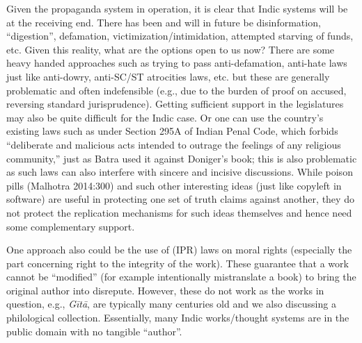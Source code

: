 Given the propaganda system in operation, it is clear that Indic systems will be at the receiving end. There has been and will in future be disinformation, “digestion”, defamation, victimization/intimidation, attempted starving of funds, etc. Given this reality, what are the options open to us now? There are some heavy handed approaches such as trying to pass anti-defamation, anti-hate laws just like anti-dowry, anti-SC/ST atrocities laws, etc. but these are generally problematic and often indefensible (e.g., due to the burden of proof on accused, reversing standard jurisprudence). Getting sufficient support in the legislatures may also be quite difficult for the Indic case. Or one can use the country’s existing laws such as under Section 295A of Indian Penal Code, which forbids “deliberate and malicious acts intended to outrage the feelings of any religious community,” just as Batra used it against Doniger’s book; this is also problematic as such laws can also interfere with sincere and incisive discussions. While poison pills (Malhotra 2014:300) and such other interesting ideas (just like copyleft in software) are useful in protecting one set of truth claims against another, they do not protect the replication mechanisms for such ideas themselves and hence need some complementary support.

One approach also could be the use of (IPR) laws on moral rights (especially the part concerning right to the integrity of the work). These guarantee that a work cannot be “modified” (for example intentionally mistranslate a book) to bring the original author into disrepute. However, these do not work as the works in question, e.g., {\sl Gītā}, are typically many centuries old and we also discussing a philological collection. Essentially, many Indic works/thought systems are in the public domain with no tangible “author”.

